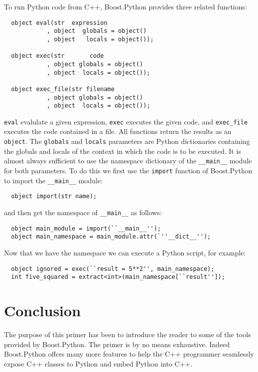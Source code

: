 To run Python code from C++, Boost.Python provides three related functions:
\begin{verbatim}
  object eval(str  expression
            , object  globals = object()
            , object   locals = object());

  object exec(str       code
            , object globals = object()
            , object  locals = object());

  object exec_file(str filename
            , object globals = object()
            , object  locals = object());
\end{verbatim}
\verb|eval| evalulate a given expression, \verb|exec| executes the given code, and \verb|exec_file| executes the code contained in a file. All functions return the results as an \verb|object|. The \verb|globals| and \verb|locals| parameters are Python dictionaries containing the globals and locals of the context in which the code is to be executed. It is almost always sufficient to use the namespace dictionary of the \verb|__main__| module for both parameters. To do this we first use the \verb|import| function of Boost.Python to import the \verb|__main__| module:
\begin{verbatim}
  object import(str name);
\end{verbatim}
and then get the namespace of \verb|__main__| as follows:
\begin{verbatim}
  object main_module = import(``__main__'');
  object main_namespace = main_module.attr(`''__dict__'');
\end{verbatim}
Now that we have the namespace we can execute a Python script, for example:
\begin{verbatim}
  object ignored = exec(``result = 5**2'', main_namespace);
  int five_squared = extract<int>(main_namespace[``result'']);
\end{verbatim}

\section{Conclusion}

The purpose of this primer has been to introduce the reader to some of the tools provided by Boost.Python. The primer is by no means exhaustive. Indeed Boost.Python offers many more features to help the C++ programmer seamlessly expose C++ classes to Python and embed Python into C++. 
